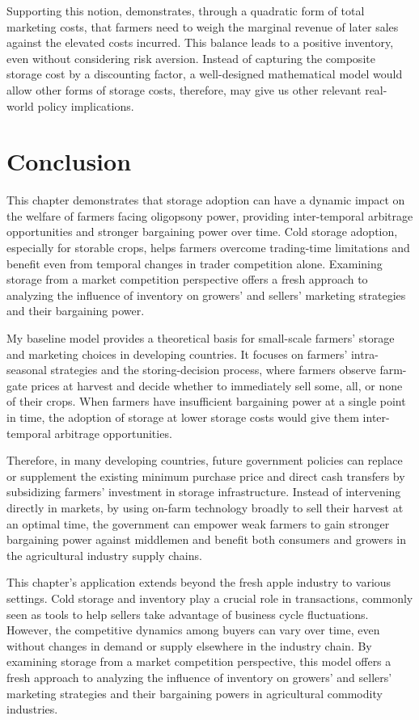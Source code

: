 Supporting this notion, \cite{williams1989economic} demonstrates, through a quadratic form of total marketing costs, that farmers need to weigh the marginal revenue of later sales against the elevated costs incurred. This balance leads to a positive inventory, even without considering risk aversion. Instead of capturing the composite storage cost by a discounting factor, a well-designed mathematical model would allow other forms of storage costs, therefore, may give us other relevant real-world policy implications.



\section{Conclusion}
\noindent This chapter demonstrates that storage adoption can have a dynamic impact on the welfare of farmers facing oligopsony power, providing inter-temporal arbitrage opportunities and stronger bargaining power over time. Cold storage adoption, especially for storable crops, helps farmers overcome trading-time limitations and benefit even from temporal changes in trader competition alone. Examining storage from a market competition perspective offers a fresh approach to analyzing the influence of inventory on growers' and sellers' marketing strategies and their bargaining power.

My baseline model provides a theoretical basis for small-scale farmers' storage and marketing choices in developing countries. It focuses on farmers' intra-seasonal strategies and the storing-decision process, where farmers observe farm-gate prices at harvest and decide whether to immediately sell some, all, or none of their crops. When farmers have insufficient bargaining power at a single point in time, the adoption of storage at lower storage costs would give them inter-temporal arbitrage opportunities. 

Therefore, in many developing countries, future government policies can replace or supplement the existing minimum purchase price and direct cash transfers by subsidizing farmers' investment in storage infrastructure. Instead of intervening directly in markets, by using on-farm technology broadly to sell their harvest at an optimal time, the government can empower weak farmers to gain stronger bargaining power against middlemen and benefit both consumers and growers in the agricultural industry supply chains.

This chapter's application extends beyond the fresh apple industry to various settings. Cold storage and inventory play a crucial role in transactions, commonly seen as tools to help sellers take advantage of business cycle fluctuations. However, the competitive dynamics among buyers can vary over time, even without changes in demand or supply elsewhere in the industry chain. By examining storage from a market competition perspective, this model offers a fresh approach to analyzing the influence of inventory on growers' and sellers' marketing strategies and their bargaining powers in agricultural commodity industries.


